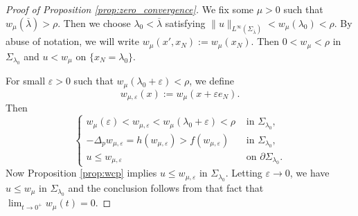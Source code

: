 \documentclass[reqno]{amsart}
\theoremstyle{plain}
\theoremstyle{definition}
\theoremstyle{remark}
\begin{document}
\begin{proof}[Proof of Proposition \ref{prop:zero_convergence}]
		We fix some $\mu>0$ such that $w_\mu(\overline{\lambda}) > \rho$. Then we choose $\lambda_0<\overline\lambda$ satisfying $\|u\|_{L^\infty(\Sigma_{\overline\lambda})} < w_\mu(\lambda_0) < \rho$. By abuse of notation, we will write $w_\mu(x',x_N):=w_\mu(x_N)$. Then $0<w_\mu<\rho$ in $\Sigma_{\lambda_0}$ and $u < w_\mu$ on $\{x_N=\lambda_0\}$.
		
		For small $\varepsilon>0$ such that $w_\mu(\lambda_0+\varepsilon)<\rho$, we define
		\[
		w_{\mu,\varepsilon}(x) := w_\mu(x + \varepsilon e_N).
		\]
		Then
		\[
		\begin{cases}
			w_\mu(\varepsilon) < w_{\mu,\varepsilon} < w_\mu(\lambda_0+\varepsilon) < \rho & \text{ in } \Sigma_{\lambda_0},\\
			-\Delta_p w_{\mu,\varepsilon} = h(w_{\mu,\varepsilon}) > f(w_{\mu,\varepsilon}) & \text{ in } \Sigma_{\lambda_0},\\
			u \le w_{\mu,\varepsilon} & \text{ on } \partial\Sigma_{\lambda_0}.
		\end{cases}
		\]
		Now Proposition \ref{prop:wcp} implies $u \le w_{\mu,\varepsilon}$ in $\Sigma_{\lambda_0}$. Letting $\varepsilon\to0$, we have $u \le w_{\mu}$ in $\Sigma_{\lambda_0}$ and the conclusion follows from that fact that $\lim_{t\to0^+} w_{\mu}(t) = 0$.
	\end{proof}
	
\end{document}
